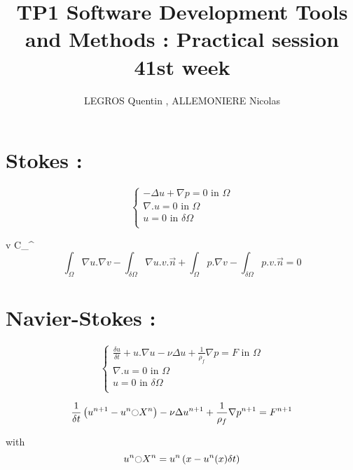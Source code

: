 \documentclass{article}
\author{LEGROS Quentin , ALLEMONIERE Nicolas}
\title{TP1 Software Development Tools and Methods : Practical session 41st week}
\begin{document}
\maketitle


\section{Stokes :} 

\begin{equation*}
\left\{
      \begin{aligned}
        - \Delta u + \nabla p = 0  \text{ in } \Omega\\
        \nabla . u = 0 \text{ in } \Omega\\
        u = 0 \text{ in } \delta \Omega\\        
      \end{aligned}
    \right.
\end{equation*}


\forall v \in C_{}^{\infty}
\begin{equation*}
\int_{\Omega} \nabla u.\nabla v - \int_{\delta \Omega} \nabla u.v.\vec{n} + \int_{\Omega} p.\nabla v - \int_{\delta \Omega} p.v.\vec{n}= 0
\end{equation*}


\section{Navier-Stokes :} 


\begin{equation*}
\left\{
      \begin{aligned}
        \frac{\delta u }{\delta t} + u.\nabla u - \nu \Delta u + \frac{1}{\rho_{f}} \nabla p = F  \text{ in } \Omega\\
        \nabla . u = 0 \text{ in } \Omega\\
        u = 0 \text{ in } \delta \Omega\\      
      \end{aligned}
    \right.
\end{equation*}


\begin{equation*}
\frac{1}{\delta t} \left( u^{n+1} - u^{n} \fullmoon X^{n} \right) - \nu \Delta u^{n+1} + \frac{1}{\rho_{f}} \nabla p^{n+1} = F^{n+1}\\   
\end{equation*}


with 
\begin{equation*}
u^{n} \fullmoon X^{n} = u^{n} \left( x - u^{n}(x) \delta t\right) 
\end{equation*}
\end{document}
